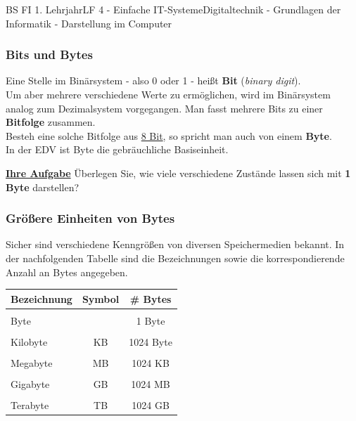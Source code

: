 \documentclass[11pt,twocolumn,oneside,openany,headings=optiontotoc,11pt,numbers=noenddot]{article}
\begin{document}
\begin{worksheet}{BS FI 1. Lehrjahr}{LF 4 - Einfache IT-Systeme}{Digitaltechnik - Grundlagen der Informatik - Darstellung im Computer}
		\subsubsection{Bits und Bytes}
		Eine Stelle im Binärsystem - also 0 oder 1 - heißt \textbf{Bit} (\textit{binary digit}).\\
		Um aber mehrere verschiedene Werte zu ermöglichen, wird im Binärsystem analog zum Dezimalsystem vorgegangen. Man fasst mehrere Bits zu einer \textbf{Bitfolge} zusammen.\\
		Besteh eine solche Bitfolge aus \underline{8 Bit}, so spricht man auch von einem \textbf{Byte}.\\
		In der EDV ist Byte die gebräuchliche Basiseinheit.\\
		\par\noindent
		\textbf{\underline{Ihre Aufgabe}} Überlegen Sie, wie viele verschiedene Zustände lassen sich mit \textbf{1 Byte} darstellen?\\
		\subsubsection{Größere Einheiten von Bytes}
		Sicher sind verschiedene Kenngrößen von diversen Speichermedien bekannt. In der nachfolgenden Tabelle sind die Bezeichnungen sowie die korrespondierende Anzahl an Bytes angegeben.\\
		\begin{tabularx}{0.45\textwidth}{l|c|c}
			\textbf{Bezeichnung} & \textbf{Symbol} & \textbf{\# Bytes}\\
			\hline
			& &\\
			Byte & & 1 Byte\\
			\hline
			& &\\
			Kilobyte & KB & 1024 Byte\\
			\hline
			& &\\
			Megabyte & MB & 1024 KB\\
			\hline
			& &\\
			Gigabyte & GB & 1024 MB\\
			\hline
			& &\\
			Terabyte & TB & 1024 GB\\
			\hline
		\end{tabularx}

\end{worksheet}
\end{document}

